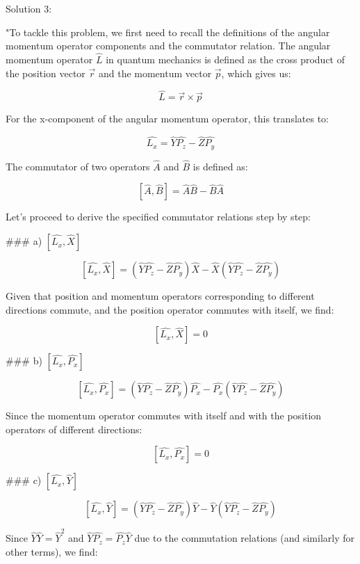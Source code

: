 Solution 3: 

"To tackle this problem, we first need to recall the definitions of the angular momentum operator components and the commutator relation. The angular momentum operator \( \hat{L} \) in quantum mechanics is defined as the cross product of the position vector \( \vec{r} \) and the momentum vector \( \vec{p} \), which gives us:

\[
\hat{L} = \vec{r} \times \vec{p}
\]

For the x-component of the angular momentum operator, this translates to:

\[
\hat{L_{x}} = \hat{Y}\hat{P_{z}} - \hat{Z}\hat{P_{y}}
\]

The commutator of two operators \( \hat{A} \) and \( \hat{B} \) is defined as:

\[
[\hat{A}, \hat{B}] = \hat{A}\hat{B} - \hat{B}\hat{A}
\]

Let's proceed to derive the specified commutator relations step by step:

### a) \( \left[ \hat{L_{x}}, \hat{X} \right] \)

\[
\left[ \hat{L_{x}}, \hat{X} \right] = (\hat{Y}\hat{P_{z}} - \hat{Z}\hat{P_{y}})\hat{X} - \hat{X}(\hat{Y}\hat{P_{z}} - \hat{Z}\hat{P_{y}})
\]

Given that position and momentum operators corresponding to different directions commute, and the position operator commutes with itself, we find:

\[
\left[ \hat{L_{x}}, \hat{X} \right] = 0
\]

### b) \( \left[ \hat{L_{x}}, \hat{P_{x}} \right] \)

\[
\left[ \hat{L_{x}}, \hat{P_{x}} \right] = (\hat{Y}\hat{P_{z}} - \hat{Z}\hat{P_{y}})\hat{P_{x}} - \hat{P_{x}}(\hat{Y}\hat{P_{z}} - \hat{Z}\hat{P_{y}})
\]

Since the momentum operator commutes with itself and with the position operators of different directions:

\[
\left[ \hat{L_{x}}, \hat{P_{x}} \right] = 0
\]

### c) \( \left[ \hat{L_{x}}, \hat{Y} \right] \)

\[
\left[ \hat{L_{x}}, \hat{Y} \right] = (\hat{Y}\hat{P_{z}} - \hat{Z}\hat{P_{y}})\hat{Y} - \hat{Y}(\hat{Y}\hat{P_{z}} - \hat{Z}\hat{P_{y}})
\]

Since \( \hat{Y} \hat{Y} = \hat{Y}^2 \) and \( \hat{Y} \hat{P_{z}} = \hat{P_{z}} \hat{Y} \) due to the commutation relations (and similarly for other terms), we find:

